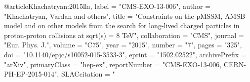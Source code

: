 @article{Khachatryan:2015lla,
      label          = "CMS-EXO-13-006",
      author         = "Khachatryan, Vardan and others",
      title          = "{Constraints on the pMSSM, AMSB model and on other models
                        from the search for long-lived charged particles in
                        proton-proton collisions at sqrt(s) = 8 TeV}",
      collaboration  = "CMS",
      journal        = "Eur. Phys. J.",
      volume         = "C75",
      year           = "2015",
      number         = "7",
      pages          = "325",
      doi            = "10.1140/epjc/s10052-015-3533-3",
      eprint         = "1502.02522",
      archivePrefix  = "arXiv",
      primaryClass   = "hep-ex",
      reportNumber   = "CMS-EXO-13-006, CERN-PH-EP-2015-014",
      SLACcitation   = "%
}

